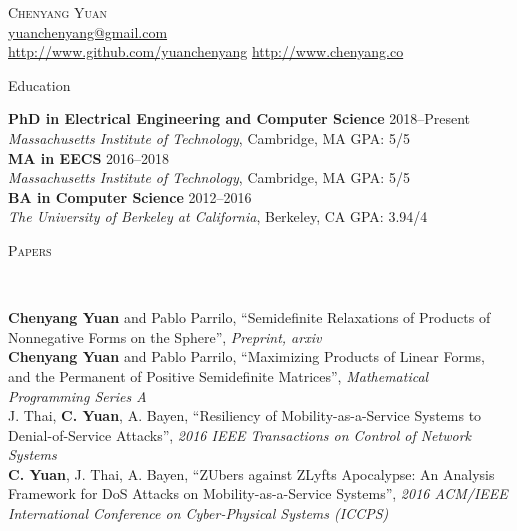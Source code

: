 \documentclass[9pt]{article}
\newenvironment{changemargin}[2]{%
  \begin{list}{}{%
      \setlength{\topsep}{0pt}%
      \setlength{\leftmargin}{#1}%
      \setlength{\rightmargin}{#2}%
      \setlength{\listparindent}{\parindent}%
      \setlength{\itemindent}{\parindent}%
      \setlength{\parsep}{\parskip}%
    }%
  \item[]}{\end{list}
}
\newcommand{\lineover}{
  \begin{changemargin}{-0.05in}{-0.05in}
    \vspace*{-8pt}
    \hrulefill \\
    \vspace*{-2pt}
  \end{changemargin}
}
\newcommand{\header}[1]{
  \begin{changemargin}{-0.5in}{-0.5in}
    \scshape{#1}\\
    \lineover
  \end{changemargin}
}
\newcommand{\contact}[4]{
  \begin{changemargin}{-0.5in}{-0.5in}
    \begin{center}
      {\Large \scshape {#1}}\\ \smallskip
      {#2}\\ \smallskip
      {#3}\\ \smallskip
      {#4}\smallskip
    \end{center}
  \end{changemargin}
}
\newenvironment{body} {
  \vspace*{-16pt}
  \begin{changemargin}{-0.25in}{-0.5in}
  }
  {\end{changemargin}
}
\begin{document}
\contact{Chenyang Yuan}{\href{mailto:yuanchenyang@gmail.com}{yuanchenyang@gmail.com}}{ \url{http://www.github.com/yuanchenyang} \quad \url{http://www.chenyang.co}}

\header{Education}

\begin{body}
  \vspace{14pt}
  \textbf{PhD in Electrical Engineering and Computer Science } \hfill  2018--Present\\
  \emph{Massachusetts Institute of Technology}, Cambridge, MA{} \hfill GPA: 5/5 \\

  \vspace{5pt}
  \textbf{MA in EECS } \hfill  2016--2018 \\
  \emph{Massachusetts Institute of Technology}, Cambridge, MA{} \hfill GPA: 5/5 \\

  \vspace{5pt}
  \textbf{BA in Computer Science} \hfill  2012--2016 \\
  \emph{The University of Berkeley at California}, Berkeley, CA{} \hfill GPA: 3.94/4 \\
\end{body}

\smallskip

\header{Papers}
\begin{body}
  \vspace{14pt}
  \textbf{Chenyang Yuan} and Pablo Parrilo, ``Semidefinite Relaxations of Products of
  Nonnegative Forms on the Sphere'', \emph{Preprint, arxiv}\\
  \textbf{Chenyang Yuan} and Pablo Parrilo, ``Maximizing Products of Linear Forms, and
  the Permanent of Positive Semidefinite Matrices'', \emph{Mathematical Programming Series A}\\
  J. Thai, \textbf{C. Yuan}, A. Bayen, ``Resiliency of Mobility-as-a-Service Systems to
  Denial-of-Service Attacks'', \emph{2016 IEEE Transactions on Control of Network Systems}\\
  \textbf{C. Yuan}, J. Thai, A. Bayen, ``ZUbers against ZLyfts Apocalypse: An Analysis
  Framework for DoS Attacks on Mobility-as-a-Service Systems'',
  \emph{2016 ACM/IEEE International Conference on Cyber-Physical Systems (ICCPS)}
\end{body}
\smallskip
\end{document}
